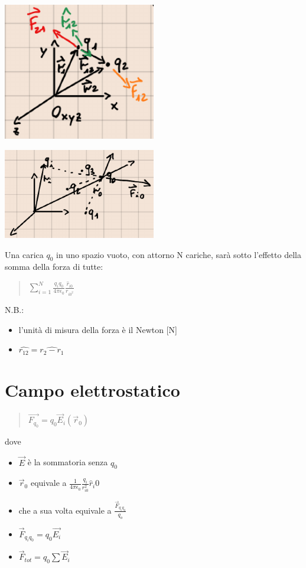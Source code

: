 \documentclass[a4paper, 12pt]{book}
\theoremstyle{plain}
\begin{document}
\begin{center}
    \includegraphics*[width=0.5\textwidth]{coulomb_2.png}
\end{center}
\begin{center}
    \includegraphics*[width=0.5\textwidth]{coulomb_3.png}
\end{center}
Una carica $q_0$ in uno spazio vuoto, con attorno N cariche, sarà sotto l'effetto della somma della forza di tutte:
\begin{quote}
    \begin{math}
        \sum_{i = 1}^N \frac{q_iq_0}{4\pi\epsilon_0}\frac{\hat{r}_{i0}}{r_{{i0}^2}}
    \end{math}
\end{quote}
N.B.: \begin{itemize}
    \item l'unità di misura della forza è il Newton [N]
    \item \begin{math}
        \hat{r_{12}} = \hat{r_2 - r_1}
    \end{math}
\end{itemize}

\section{Campo elettrostatico}
\begin{quote}
    \begin{math}
        \vec{F_{q_0}} = q_0\vec{E}_i(\vec{r}_0)
    \end{math}
\end{quote}
dove
\begin{itemize}
    \item $\vec{E}$ è la sommatoria senza $q_0$
    \item $\vec{r}_0$ equivale a $\frac{1}{4\pi\epsilon_0}\frac{q_i}{r^2_{i0}}\hat{r}_i0$
    \item che a sua volta equivale a $\frac{\vec{F}_{q_iq_0}}{q_o}$
    \item $\vec{F}_{q_iq_0} = q_0\vec{E_i}$
    \item $\vec{F}_{tot} = q_0\sum \vec{E}_i$
\end{itemize}
\end{document}
